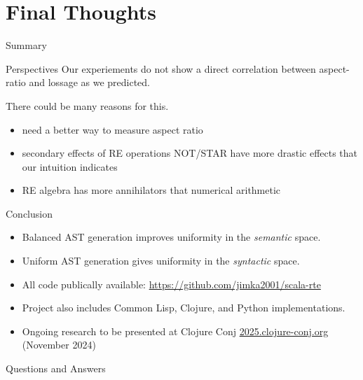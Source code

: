 \section{Final Thoughts}

{  %
\begin{frame}{Summary}

\end{frame}
}

\begin{frame}{Perspectives}
  Our experiements do not show a direct correlation between aspect-ratio and lossage as we predicted.

  There could be many reasons for this.

  \begin{itemize}
  \item need a better way to measure aspect ratio
  \item secondary effects of RE operations NOT/STAR have more drastic effects that our intuition indicates
  \item RE algebra has more annihilators that numerical arithmetic

  \end{itemize}
\end{frame}

\begin{frame}{Conclusion}
  \begin{itemize}
  \item Balanced AST generation improves uniformity in the \emph{semantic} space.
  \item Uniform AST generation gives uniformity in the \emph{syntactic} space.
  \item All code publically available: \url{https://github.com/jimka2001/scala-rte}
  \item Project also includes Common Lisp, Clojure, and Python implementations.
  \item Ongoing research to be presented at Clojure Conj \url{2025.clojure-conj.org} (November 2024)
  \end{itemize}
\end{frame}

\begin{frame}{Questions and Answers}
\end{frame}
